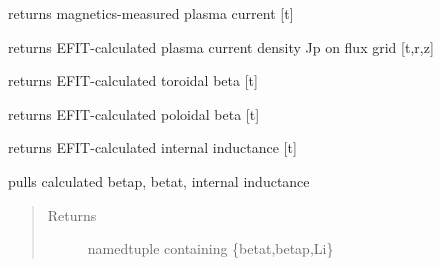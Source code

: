\documentclass[letterpaper,10pt,english]{sphinxmanual}
\begin{document}
\begin{fulllineitems}
\begin{fulllineitems}
\end{fulllineitems}


\begin{fulllineitems}
\label{eqtools:eqtools.EFIT.EFITTree.getIpMeas}
returns magnetics-measured plasma current {[}t{]}

\end{fulllineitems}


\begin{fulllineitems}
\label{eqtools:eqtools.EFIT.EFITTree.getJp}
returns EFIT-calculated plasma current density Jp on flux grid {[}t,r,z{]}

\end{fulllineitems}


\begin{fulllineitems}
\label{eqtools:eqtools.EFIT.EFITTree.getBetaT}
returns EFIT-calculated toroidal beta {[}t{]}

\end{fulllineitems}


\begin{fulllineitems}
\label{eqtools:eqtools.EFIT.EFITTree.getBetaP}
returns EFIT-calculated poloidal beta {[}t{]}

\end{fulllineitems}


\begin{fulllineitems}
\label{eqtools:eqtools.EFIT.EFITTree.getLi}
returns EFIT-calculated internal inductance {[}t{]}

\end{fulllineitems}


\begin{fulllineitems}
\label{eqtools:eqtools.EFIT.EFITTree.getBetas}
pulls calculated betap, betat, internal inductance
\begin{quote}\begin{description}
\item[{Returns}] \leavevmode
namedtuple containing \{betat,betap,Li\}


\end{description}
\end{quote}
\end{fulllineitems}
\end{fulllineitems}
\end{document}
